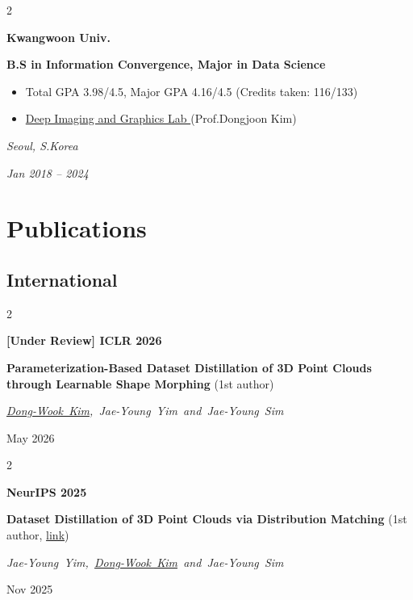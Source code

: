 \documentclass[10pt, letterpaper]{article}
\newenvironment{highlights}{
    \begin{itemize}[
        topsep=0.10 cm,
        parsep=0.10 cm,
        partopsep=0pt,
        itemsep=0pt,
        leftmargin=0.4 cm + 10pt
    ]
}{
    \end{itemize}
} %
\newenvironment{twocolentry}[2][]{
    \onecolentry
    \def\secondColumn{#2}
    \setcolumnwidth{\fill, 3.5 cm}
    \begin{paracol}{2}
}{
    \switchcolumn \raggedleft \secondColumn
    \end{paracol}
    \endonecolentry
} %
\let\hrefWithoutArrow\href
\renewcommand{\href}[2]{\hrefWithoutArrow{#1}{\ifthenelse{\equal{#2}{}}{ }{#2 }\raisebox{.15ex}{\footnotesize \faExternalLink*}}}
\begin{document}
        \begin{twocolentry}{
            \small\textit{Seoul, S.Korea}
            
            \vspace{0.2cm}
            
            \textit{Jan 2018 – 2024}
        }
            \textbf{\color{headingOrange}Kwangwoon Univ.}
            
            \vspace{0.2cm}
            
            \textbf{B.S in Information Convergence, Major in Data Science}
            \begin{highlights}
                \item Total GPA 3.98/4.5, Major GPA 4.16/4.5 (Credits taken: 116/133)
                \item \hrefWithoutArrow{https://korfriend.github.io/}{Deep Imaging and Graphics Lab \faLink}(Prof.Dongjoon Kim)
            \end{highlights}
        \end{twocolentry}
        
        \vspace{0.2 cm}


    
    \section{Publications}
    \subsection{International}


        \begin{twocolentry}{
            May 2026
        }
            \textbf{\color{headingOrange}[Under Review] ICLR 2026}

            \textbf{Parameterization-Based Dataset Distillation of 3D Point Clouds through Learnable Shape Morphing}
            (1st author) 

            \mbox{\textit{\underline{Dong-Wook Kim}, Jae-Young Yim  and Jae-Young Sim}}
            
            \vspace{0.10 cm}
            
        \end{twocolentry}
    
        \begin{twocolentry}{
            Nov 2025
        }
            \textbf{\color{headingOrange}NeurIPS 2025}

            \textbf{Dataset Distillation of 3D Point Clouds via Distribution Matching}
            (1st author, \hrefWithoutArrow{https://github.com/donguk071/SADM}{\faLink link}) 

            \mbox{\textit{Jae-Young Yim, \underline{Dong-Wook Kim} and Jae-Young Sim}}
            \vspace{0.10 cm}
            
        \end{twocolentry}
\end{document}
